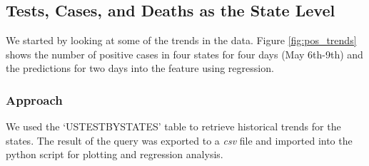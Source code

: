 \documentclass[11pt]{article}
\begin{document}
\subsection{Tests, Cases, and Deaths as the State Level}

\noindent
We started by looking at some of the trends in the data. Figure \ref{fig:pos_trends} shows the number of positive cases in four states for four days (May 6th-9th) and the predictions for two days into the feature using regression.
\subsubsection{Approach}
We used the `USTESTBYSTATES' table to retrieve historical trends for the states. The result of the query was exported to a \textit{csv} file and imported into the python script for plotting and regression analysis.
\end{document}
